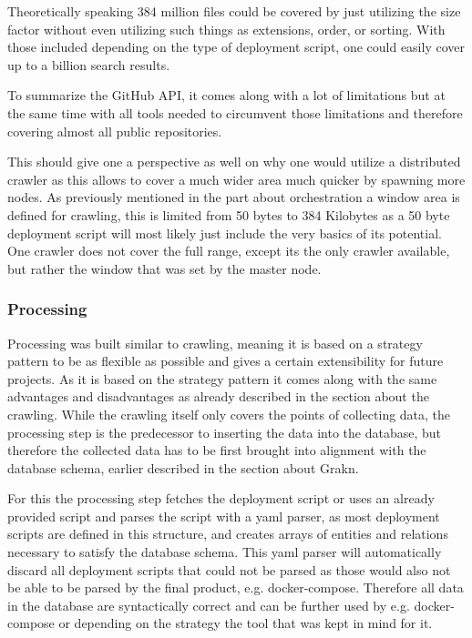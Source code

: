 Theoretically speaking 384 million files could be covered by just utilizing the size factor without even utilizing such things as extensions, order, or sorting. With those included depending on the type of deployment script, one could easily cover up to a billion search results.

To summarize the GitHub API, it comes along with a lot of limitations but at the same time with all tools needed to circumvent those limitations and therefore covering almost all public repositories.

This should give one a perspective as well on why one would utilize a distributed crawler as this allows to cover a much wider area much quicker by spawning more nodes. As previously mentioned in the part about orchestration a window area is defined for crawling, this is limited from 50 bytes to 384 Kilobytes as a 50 byte deployment script will most likely just include the very basics of its potential. One crawler does not cover the full range, except its the only crawler available, but rather the window that was set by the master node.

\subsubsection{Processing}
Processing was built similar to crawling, meaning it is based on a strategy pattern to be as flexible as possible and gives a certain extensibility for future projects. As it is based on the strategy pattern it comes along with the same advantages and disadvantages as already described in the section about the crawling.
While the crawling itself only covers the points of collecting data, the processing step is the predecessor to inserting the data into the database, but therefore the collected data has to be first brought into alignment with the database schema, earlier described in the section about Grakn.

For this the processing step fetches the deployment script or uses an already provided script and parses the script with a yaml parser, as most deployment scripts are defined in this structure, and creates arrays of entities and relations necessary to satisfy the database schema. This yaml parser will automatically discard all deployment scripts that could not be parsed as those would also not be able to be parsed by the final product, e.g. docker-compose. Therefore all data in the database are syntactically correct and can be further used by e.g. docker-compose or depending on the strategy the tool that was kept in mind for it.

